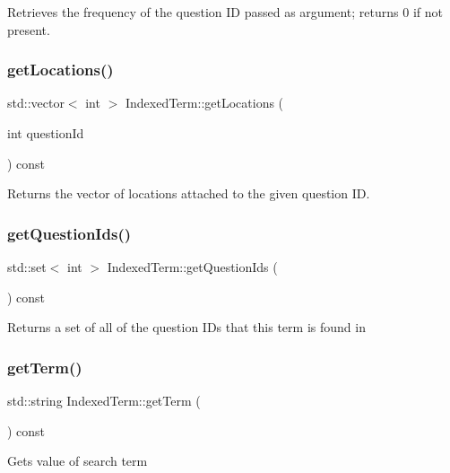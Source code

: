 Retrieves the frequency of the question ID passed as argument; returns 0 if not present. \mbox{\label{classIndexedTerm_a195c332d821640539eadeca10514cc82}} 
\subsubsection{\texorpdfstring{get\+Locations()}{getLocations()}}
{\footnotesize\ttfamily std\+::vector$<$ int $>$ Indexed\+Term\+::get\+Locations (\begin{DoxyParamCaption}\item[{int}]{question\+Id }\end{DoxyParamCaption}) const}

Returns the vector of locations attached to the given question ID. \mbox{\label{classIndexedTerm_a585907deff7738139894dd45afa11a63}} 
\subsubsection{\texorpdfstring{get\+Question\+Ids()}{getQuestionIds()}}
{\footnotesize\ttfamily std\+::set$<$ int $>$ Indexed\+Term\+::get\+Question\+Ids (\begin{DoxyParamCaption}{ }\end{DoxyParamCaption}) const}

Returns a set of all of the question I\+Ds that this term is found in \mbox{\label{classIndexedTerm_a6e41546c9874e5382b969c41e87c3d8b}} 
\subsubsection{\texorpdfstring{get\+Term()}{getTerm()}}
{\footnotesize\ttfamily std\+::string Indexed\+Term\+::get\+Term (\begin{DoxyParamCaption}{ }\end{DoxyParamCaption}) const}

Gets value of search term \mbox{\label{classIndexedTerm_ae39f762b1fce474a50bde0a411d34f70}} 
